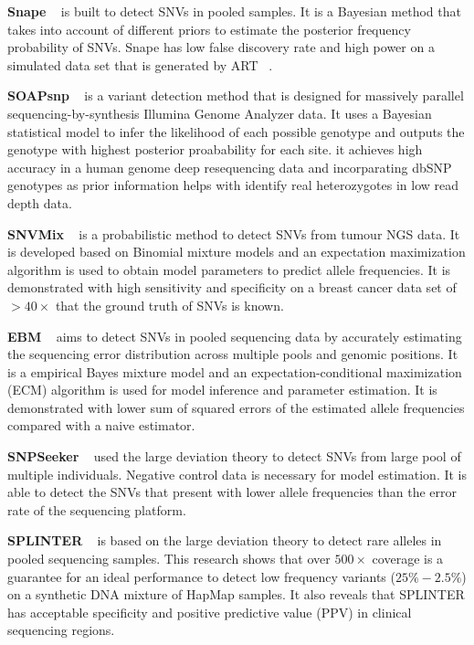 \documentclass[11pt,reqno]{amsart}
\begin{document}
\textbf{Snape} ~\citep{Raineri2012} is built to detect SNVs in pooled samples.
It is a Bayesian method that takes into account of different priors to estimate the posterior frequency probability of SNVs.
Snape has low false discovery rate and high power on a simulated data set that is generated by ART ~\citep{huang2012art}.

\textbf{SOAPsnp} ~\citep{Li2009} is a variant detection method that is designed for massively parallel sequencing-by-synthesis Illumina Genome Analyzer data.
It uses a Bayesian statistical model to infer the likelihood of each possible genotype and outputs the genotype with highest posterior proabability for each site.
it achieves high accuracy in a human genome deep resequencing data and incorparating dbSNP genotypes as prior information helps with identify real heterozygotes in low read depth data.

\textbf{SNVMix} ~\citep{Goya2010} is a probabilistic method to detect SNVs from tumour NGS data.
It is developed based on Binomial mixture models and an expectation maximization algorithm is used to obtain model parameters to predict allele frequencies.
It is demonstrated with high sensitivity and specificity on a breast cancer data set of $> 40 \times$ that the ground truth of SNVs is known.

\textbf{EBM} ~\citep{Zhou2012} aims to detect SNVs in pooled sequencing data by accurately estimating the sequencing error distribution across multiple pools and genomic positions. 
It is a empirical Bayes mixture model and an expectation-conditional maximization (ECM) algorithm is used for model inference and parameter estimation.
It is demonstrated with lower sum of squared errors of the estimated allele frequencies compared with a naive estimator.

\textbf{SNPSeeker} ~\citep{Druley2009} used the large deviation theory to detect SNVs from large pool of multiple individuals.
Negative control data is necessary for model estimation.
It is able to detect the SNVs that present with lower allele frequencies than the error rate of the sequencing platform.

\textbf{SPLINTER} ~\citep{Spencer2014} is based on the large deviation theory to detect rare alleles in pooled sequencing samples.
This research shows that over $500 \times$ coverage is a guarantee for an ideal performance to detect low frequency variants ($25\% - 2.5\%$) on a synthetic DNA mixture of HapMap samples.
It also reveals that SPLINTER has acceptable specificity and positive predictive value (PPV) in clinical sequencing regions.
\end{document}
